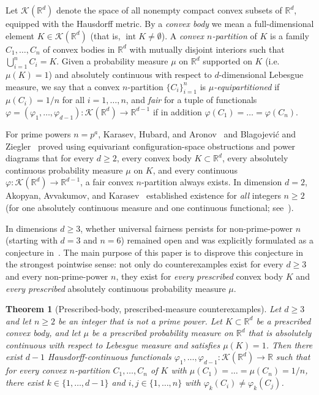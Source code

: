 \documentclass[11pt,a4paper]{amsart}
\numberwithin{equation}{section}
\newtheorem{theorem}{Theorem}[section]
\theoremstyle{definition}
\newcommand{\R}{\mathbb{R}}
\newcommand{\Kcal}{\mathcal{K}}
\newcommand{\inte}{\operatorname{int}}
\begin{document}
Let $\Kcal(\R^d)$ denote the space of all nonempty compact convex subsets of $\R^d$, equipped with the Hausdorff metric. By a \emph{convex body} we mean a full-dimensional element $K \in \Kcal(\R^d)$ (that is, $\inte K \ne \emptyset$). A \emph{convex $n$-partition} of $K$ is a family $C_1, \dots, C_n$ of convex bodies in $\R^d$ with mutually disjoint interiors such that $\bigcup_{i=1}^n C_i = K$. Given a probability measure $\mu$ on $\R^d$ supported on $K$ (i.e.\ $\mu(K) = 1$) and absolutely continuous with respect to $d$-dimensional Lebesgue measure, we say that a convex $n$-partition $\{C_i\}_{i=1}^n$ is \emph{$\mu$-equipartitioned} if $\mu(C_i) = 1/n$ for all $i = 1, \dots, n$, and \emph{fair} for a tuple of functionals $\varphi = (\varphi_1, \dots, \varphi_{d-1}) : \Kcal(\R^d) \to \R^{d-1}$ if in addition $\varphi(C_1) = \dots = \varphi(C_n)$.

For prime powers $n = p^a$, Karasev, Hubard, and Aronov~\cite{KHA2014} and Blagojevi\'c and Ziegler~\cite{BZ2014} proved using equivariant configuration-space obstructions and power diagrams that for every $d \ge 2$, every convex body $K \subset \R^d$, every absolutely continuous probability measure $\mu$ on $K$, and every continuous $\varphi : \Kcal(\R^d) \to \R^{d-1}$, a fair convex $n$-partition always exists. In dimension $d = 2$, Akopyan, Avvakumov, and Karasev~\cite{AAK2018} established existence for \emph{all} integers $n \ge 2$ (for one absolutely continuous measure and one continuous functional; see~\cite[Theorem~7.1]{AAK2018}).

In dimensions $d \ge 3$, whether universal fairness persists for non-prime-power $n$ (starting with $d=3$ and $n=6$) remained open and was explicitly formulated as a conjecture in~\cite[Conjecture~1.2]{BKS2023}. The main purpose of this paper is to disprove this conjecture in the strongest pointwise sense: not only do counterexamples exist for every $d \ge 3$ and every non-prime-power $n$, they exist for \emph{every prescribed} convex body $K$ and \emph{every prescribed} absolutely continuous probability measure $\mu$.

\begin{theorem}[Prescribed-body, prescribed-measure counterexamples]
\label{thm:prescribed}
Let $d \ge 3$ and let $n \ge 2$ be an integer that is not a prime power. Let $K \subset \R^d$ be a prescribed convex body, and let $\mu$ be a prescribed probability measure on $\R^d$ that is absolutely continuous with respect to Lebesgue measure and satisfies $\mu(K) = 1$. Then there exist $d-1$ Hausdorff-continuous functionals $\varphi_1, \dots, \varphi_{d-1} : \Kcal(\R^d) \to \R$ such that for every convex $n$-partition $C_1, \dots, C_n$ of $K$ with $\mu(C_1) = \dots = \mu(C_n) = 1/n$, there exist $k \in \{1,\dots,d-1\}$ and $i, j \in \{1,\dots,n\}$ with $\varphi_k(C_i) \ne \varphi_k(C_j)$.
\end{theorem}
\end{document}
